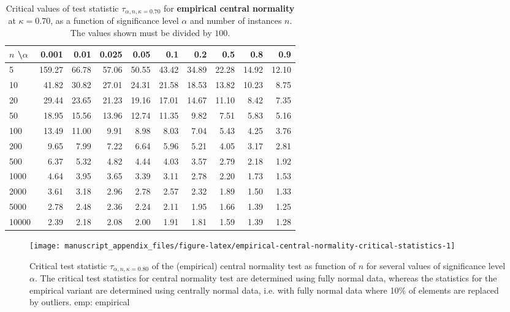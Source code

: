 \documentclass[
  a4paper,
]{article}
\begin{document}
\begin{table}
\begin{center}
\caption{Critical values of test statistic $\tau_{\alpha, n, \kappa = 0.70}$ for
\textbf{empirical central normality} at $\kappa = 0.70$, as a function of significance 
level $\alpha$ and number of instances $n$. The values shown must be divided by $100$.}
\label{tab:empirical-central-normality-critical-statistic}
\begin{tabular}{l | r r r r r r r r r}

\toprule
$n$ \textbackslash $\alpha$ & 0.001 & 0.01 & 0.025 & 0.05 & 0.1 & 0.2 & 0.5 & 0.8 & 0.9 \\

\midrule
    5 & 159.27 & 66.78 & 57.06 & 50.55 & 43.42 & 34.89 & 22.28 & 14.92 & 12.10 \\
   10 &  41.82 & 30.82 & 27.01 & 24.31 & 21.58 & 18.53 & 13.82 & 10.23 &  8.75 \\
   20 &  29.44 & 23.65 & 21.23 & 19.16 & 17.01 & 14.67 & 11.10 &  8.42 &  7.35 \\
   50 &  18.95 & 15.56 & 13.96 & 12.74 & 11.35 &  9.82 &  7.51 &  5.83 &  5.16 \\ 
  100 &  13.49 & 11.00 &  9.91 &  8.98 &  8.03 &  7.04 &  5.43 &  4.25 &  3.76 \\
  200 &   9.65 &  7.99 &  7.22 &  6.64 &  5.96 &  5.21 &  4.05 &  3.17 &  2.81 \\
  500 &   6.37 &  5.32 &  4.82 &  4.44 &  4.03 &  3.57 &  2.79 &  2.18 &  1.92 \\
 1000 &   4.64 &  3.95 &  3.65 &  3.39 &  3.11 &  2.78 &  2.20 &  1.73 &  1.53 \\
 2000 &   3.61 &  3.18 &  2.96 &  2.78 &  2.57 &  2.32 &  1.89 &  1.50 &  1.33 \\
 5000 &   2.78 &  2.48 &  2.36 &  2.24 &  2.11 &  1.95 &  1.66 &  1.39 &  1.25 \\
10000 &   2.39 &  2.18 &  2.08 &  2.00 &  1.91 &  1.81 &  1.59 &  1.39 &  1.28 \\
\bottomrule
\end{tabular}
\end{center}
\end{table}

\begin{figure}

{\centering \texttt{[image: manuscript\_appendix\_files/figure-latex/empirical-central-normality-critical-statistics-1]} 

}

\caption{Critical test statistic $\tau_{\alpha, n, \kappa = 0.80}$ of the (empirical) central normality test as function of $n$ for several values of significance level $\alpha$. The critical test statistics for central normality test are determined using fully normal data, whereas the statistics for the empirical variant are determined using centrally normal data, i.e. with fully normal data where 10\% of elements are replaced by outliers. emp: empirical}\label{fig:empirical-central-normality-critical-statistics}
\end{figure}
\end{document}
